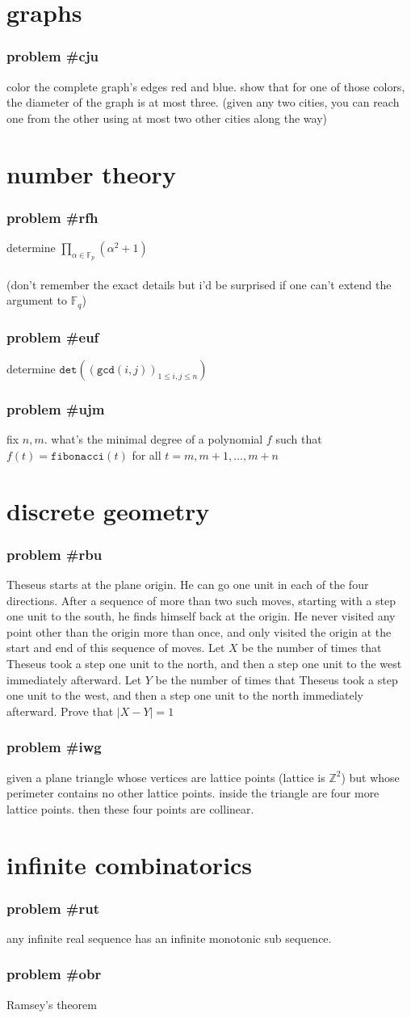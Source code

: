 \documentclass{article}
\newcommand{\problem}[1]{\subsubsection*{\textbf{problem \##1}}}
\newcommand{\chapter}[1]{\section*{#1}}
\newcommand{\Z}{\mathbb{Z}}
\newcommand{\F}{\mathbb{F}}
\newcommand{\FNC}[1]{\texttt{#1}}
\begin{document}
\chapter{graphs}
\problem{cju} color the complete graph's edges red and blue. show that for one of those colors, the diameter of the graph is at most three. (given any two cities, you can reach one from the other using at most two other cities along the way)
\chapter{number theory}
\problem{rfh} determine $\displaystyle{\prod_{\alpha\in\F_p}(\alpha^2+1)}$\\\\
(don't remember the exact details but i'd be surprised if one can't extend the argument to $\F_q$)
\problem{euf} determine $\FNC{det}((\FNC{gcd}(i,j))_{1\le i,j\le n})$
\problem{ujm} fix $n,m$. what's the minimal degree of a polynomial $f$ such that $f(t)=\FNC{fibonacci}(t)$ for all $t=m,m+1,\dots,m+n$
\chapter{discrete geometry}
\problem{rbu} Theseus starts at the plane origin. He can go one unit in each of the four directions. After a sequence
of more than two such moves, starting with a step one unit to the south, he finds himself back at the origin. He never visited any point other than the origin more than once, and only visited the origin at the start and end of this sequence of moves. Let $X$ be the number of times that Theseus took a step one unit to the north, and then a step one unit to the west immediately afterward. Let $Y$ be the number of times that Theseus took a step one unit to the west, and then a step one unit to the north immediately afterward. Prove that $|X-Y| = 1$
\problem{iwg} given a plane triangle whose vertices are lattice points (lattice is $\Z^2$) but whose perimeter contains no other lattice points. inside the triangle are four more lattice points. then these four points are collinear.
\chapter{infinite combinatorics}
\problem{rut} any infinite real sequence has an infinite monotonic sub sequence.
\problem{obr} Ramsey's theorem
\end{document}
